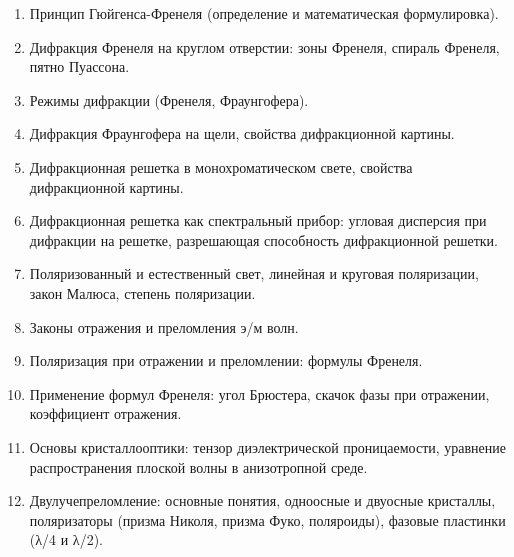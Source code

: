 \begin{enumerate}
    \item Принцип Гюйгенса-Френеля (определение и математическая формулировка).

    \item Дифракция Френеля на круглом отверстии: зоны Френеля, спираль Френеля, пятно Пуассона.

    \item Режимы дифракции (Френеля, Фраунгофера).

    \item Дифракция Фраунгофера на щели, свойства дифракционной картины.

    \item Дифракционная решетка в монохроматическом свете, свойства дифракционной картины.

    \item Дифракционная решетка как спектральный прибор: угловая дисперсия при дифракции на решетке, разрешающая способность дифракционной решетки.

    \item Поляризованный и естественный свет, линейная и круговая поляризации, закон Малюса, степень поляризации.

    \item Законы отражения и преломления э/м волн.

    \item Поляризация при отражении и преломлении: формулы Френеля.

    \item Применение формул Френеля: угол Брюстера, скачок фазы при отражении, коэффициент отражения.

    \item Основы кристаллооптики: тензор диэлектрической проницаемости, уравнение распространения плоской волны в анизотропной среде.

    \item Двулучепреломление: основные понятия, одноосные и двуосные кристаллы, поляризаторы (призма Николя, призма Фуко, поляроиды), фазовые пластинки (λ/4 и λ/2).
\end{enumerate}
